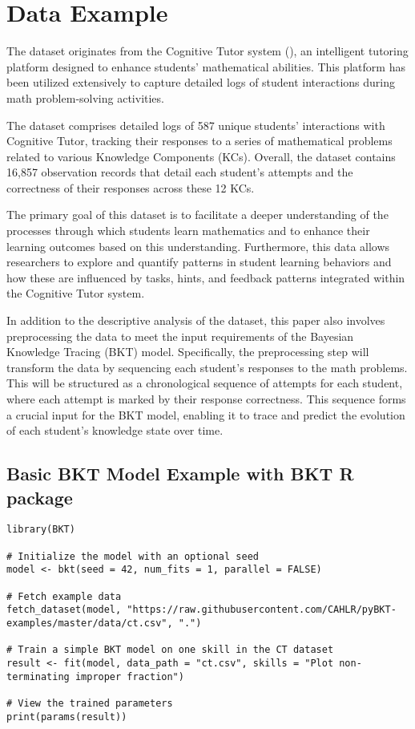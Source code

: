 \documentclass{article}
\begin{document}
\section{Data Example}

The dataset originates from the Cognitive Tutor system (\cite{ritter2007cognitive}), an intelligent tutoring platform designed to enhance students' mathematical abilities. This platform has been utilized extensively to capture detailed logs of student interactions during math problem-solving activities.

The dataset comprises detailed logs of 587 unique students' interactions with Cognitive Tutor, tracking their responses to a series of mathematical problems related to various Knowledge Components (KCs). Overall, the dataset contains 16,857 observation records that detail each student's attempts and the correctness of their responses across these 12 KCs.

The primary goal of this dataset is to facilitate a deeper understanding of the processes through which students learn mathematics and to enhance their learning outcomes based on this understanding. Furthermore, this data allows researchers to explore and quantify patterns in student learning behaviors and how these are influenced by tasks, hints, and feedback patterns integrated within the Cognitive Tutor system.

In addition to the descriptive analysis of the dataset, this paper also involves preprocessing the data to meet the input requirements of the Bayesian Knowledge Tracing (BKT) model. Specifically, the preprocessing step will transform the data by sequencing each student's responses to the math problems. This will be structured as a chronological sequence of attempts for each student, where each attempt is marked by their response correctness. This sequence forms a crucial input for the BKT model, enabling it to trace and predict the evolution of each student's knowledge state over time.

\subsection{Basic BKT Model Example with BKT R package}

\begin{lstlisting}[caption={R code to train a simple BKT model}]
library(BKT)

# Initialize the model with an optional seed
model <- bkt(seed = 42, num_fits = 1, parallel = FALSE)

# Fetch example data
fetch_dataset(model, "https://raw.githubusercontent.com/CAHLR/pyBKT-examples/master/data/ct.csv", ".")

# Train a simple BKT model on one skill in the CT dataset
result <- fit(model, data_path = "ct.csv", skills = "Plot non-terminating improper fraction")

# View the trained parameters
print(params(result))
\end{lstlisting}
\end{document}
